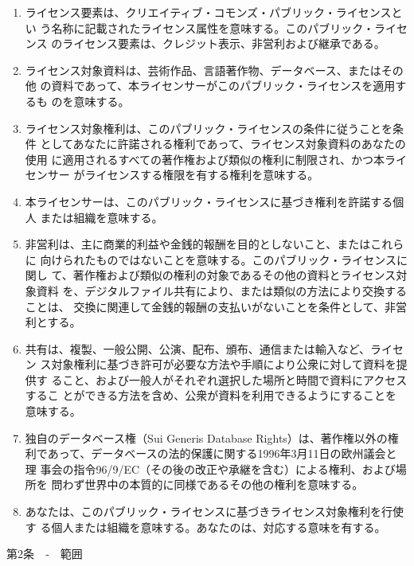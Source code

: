 {\begin{enumerate}
アユース、フェアディーリングまたは著作権および類似の権利に関するその他
の除外や制限を意味する。
\item ライセンス要素は、クリエイティブ・コモンズ・パブリック・ライセンスとい
う名称に記載されたライセンス属性を意味する。このパブリック・ライセンス
のライセンス要素は、クレジット表示、非営利および継承である。
\item ライセンス対象資料は、芸術作品、言語著作物、データベース、またはその他
の資料であって、本ライセンサーがこのパブリック・ライセンスを適用するも
のを意味する。
\item ライセンス対象権利は、このパブリック・ライセンスの条件に従うことを条件
としてあなたに許諾される権利であって、ライセンス対象資料のあなたの使用
に適用されるすべての著作権および類似の権利に制限され、かつ本ライセンサー
がライセンスする権限を有する権利を意味する。
\item 本ライセンサーは、このパブリック・ライセンスに基づき権利を許諾する個人
または組織を意味する。
\item 非営利は、主に商業的利益や金銭的報酬を目的としないこと、またはこれらに
向けられたものではないことを意味する。このパブリック・ライセンスに関し
て、著作権および類似の権利の対象であるその他の資料とライセンス対象資料
を、デジタルファイル共有により、または類似の方法により交換することは、
交換に関連して金銭的報酬の支払いがないことを条件として、非営利とする。
\item 共有は、複製、一般公開、公演、配布、頒布、通信または輸入など、ライセン
ス対象権利に基づき許可が必要な方法や手順により公衆に対して資料を提供す
ること、および一般人がそれぞれ選択した場所と時間で資料にアクセスするこ
とができる方法を含め、公衆が資料を利用できるようにすることを意味する。
\item 独自のデータベース権（Sui Generis Database Rights）は、著作権以外の権
利であって、データベースの法的保護に関する1996年3月11日の欧州議会と理
事会の指令96/9/EC（その後の改正や承継を含む）による権利、および場所を
問わず世界中の本質的に同様であるその他の権利を意味する。
\item あなたは、このパブリック・ライセンスに基づきライセンス対象権利を行使す
る個人または組織を意味する。あなたのは、対応する意味を有する。
\end{enumerate}

第2条　‐　範囲

}

